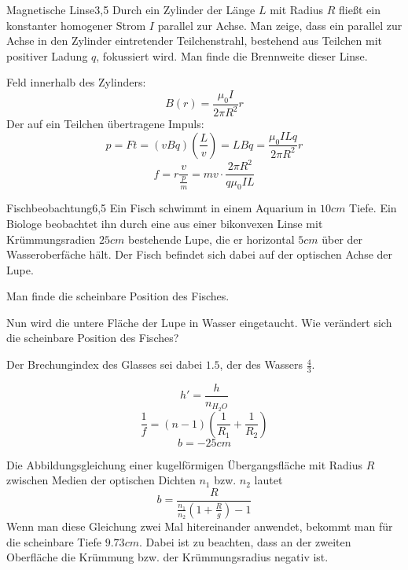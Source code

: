 


\begin{problem}{Magnetische Linse}{3,5}
Durch ein Zylinder der Länge $L$ mit Radius $R$ fließt ein konstanter homogener Strom $I$ parallel zur Achse. Man zeige, dass ein parallel zur Achse in den Zylinder eintretender Teilchenstrahl, bestehend aus Teilchen mit positiver Ladung $q$, fokussiert wird. Man finde die Brennweite dieser Linse.
\begin{solution}
Feld innerhalb des Zylinders:
\[
B(r)=\frac{\mu_0 I}{2 \pi R^2}r
\]
Der auf ein Teilchen übertragene Impuls:
\[
p=Ft=(vBq)(\frac Lv)=LBq=\frac{\mu_0 I L q}{2 \pi R^2}r
\]
\[
f=r\frac{v}{\frac pm}=mv \cdot \frac{2 \pi R^2}{q \mu_0 I L}
\]
\end{solution}
\end{problem}

\begin{problem}{Fischbeobachtung}{6,5}
Ein Fisch schwimmt in einem Aquarium in $10 \unit{cm}$ Tiefe. Ein Biologe beobachtet ihn durch eine aus einer bikonvexen Linse mit Krümmungsradien $25 \unit{cm}$ bestehende Lupe, die er horizontal $5 \unit{cm}$ über der Wasseroberfäche hält. Der Fisch befindet sich dabei auf der optischen Achse der Lupe.
\begin{abcenum}
\item Man finde die scheinbare Position des Fisches.
\item Nun wird die untere Fläche der Lupe in Wasser eingetaucht. Wie verändert sich die scheinbare Position des Fisches?
\end{abcenum}
Der Brechungindex des Glasses sei dabei $1.5$, der des Wassers $\frac43$.
\begin{solution}
\begin{abcenum}
\item
\[
h'=\frac{h}{n_{H_2O}}
\]
\[
\frac 1f = (n-1)\left( \frac 1{R_1}+\frac 1{R_2} \right)
\]
\[
b=-25 \unit{cm}
\]
\item
Die Abbildungsgleichung einer kugelförmigen Übergangsfläche mit Radius $R$ zwischen Medien der optischen Dichten $n_1$ bzw. $n_2$ lautet
\[
b = \frac{R}{\frac{n_1}{n_2} \left( 1+\frac R g \right) -1}
\]
Wenn man diese Gleichung zwei Mal hitereinander anwendet, bekommt man für die scheinbare Tiefe $9.73 \unit{cm}$. Dabei ist zu beachten, dass an der zweiten Oberfläche die Krümmung bzw. der Krümmungsradius negativ ist.
\end{abcenum}
\end{solution}
\end{problem}


